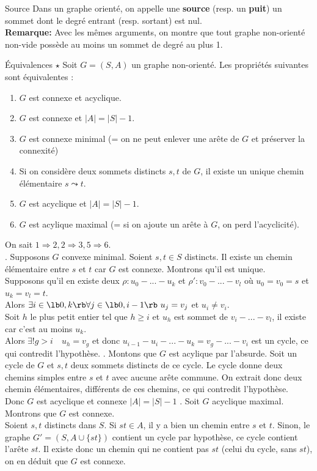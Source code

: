 \documentclass[french, 11pt]{article}
\begin{document}
\begin{defi}{Source}{}
    Dans un graphe orienté, on appelle une \textbf{source} (resp. un \textbf{puit}) un sommet dont le degré entrant (resp. sortant) est nul.\\
    \textbf{Remarque:} Avec les mêmes arguments, on montre que tout graphe non-orienté non-vide possède au moins un sommet de degré au plus 1.
\end{defi}

\begin{prop}{Équivalences $\star$}{}
    Soit $G=(S,A)$ un graphe non-orienté. Les propriétés suivantes sont équivalentes :
    \begin{enumerate}[topsep=0pt,itemsep=-0.9 ex]
        \item $G$ est connexe et acyclique.
        \item $G$ est connexe et $|A|=|S|-1$.
        \item $G$ est connexe minimal (= on ne peut enlever une arête de $G$ et préserver la connexité)
        \item Si on considère deux sommets distincts $s,t$ de $G$, il existe un unique chemin élémentaire $s\leadsto t$.
        \item $G$ est acyclique et $|A|=|S|-1$.
        \item $G$ est acylique maximal (= si on ajoute un arête à $G$, on perd l'acyclicité).
    \end{enumerate}
    \tcblower
    On sait $1\Rightarrow2,2\Rightarrow3,5\Rightarrow6$.\\
    . Supposons $G$ convexe minimal. Soient $s,t\in S$ distincts. Il existe un chemin élémentaire entre $s$ et $t$ car $G$ est connexe. Montrons qu'il est unique.\\
    Supposons qu'il en existe deux $\rho:u_0-...-u_k$ et $\rho':v_0-...-v_l$ où $u_0=v_0=s$ et $u_k=v_l=t$.\\
    Alors $\exists i \in \lb0,k\rb \forall j \in \lb 0, i-1 \rb ~ u_j = v_j$ et $u_i\neq v_i$.\\
    Soit $h$ le plus petit entier tel que $h\geq i$ et $u_h$ est sommet de $v_i-...-v_l$, il existe car c'est au moins $u_k$.\\
    Alors $\exists!g>i \quad u_h=v_g$  et donc $u_{i-1}-u_i-...-u_k=v_g-...-v_i$ est un cycle, ce qui contredit l'hypothèse.\n
    . Montons que $G$ est acylique par l'absurde. Soit un cycle de $G$ et $s,t$ deux sommets distincts de ce cycle.
    Le cycle donne deux chemins simples entre $s$ et $t$ avec aucune arête commune. On extrait donc deux chemin élémentaires, différents de ces chemins, ce qui contredit l'hypothèse.\\
    Donc $G$ est acyclique et connexe $|A|=|S|-1$\n
    . Soit $G$ acyclique maximal. Montrons que $G$ est connexe.\\
    Soient $s,t$ distincts dans $S$. Si $st\in A$, il y a bien un chemin entre $s$ et $t$. Sinon, le graphe $G'=(S,A\cup\{st\})$ contient un cycle par hypothèse, ce cycle contient l'arête $st$. Il existe donc un chemin qui ne contient pas $st$ (celui du cycle, sans $st$), on en déduit que $G$ est connexe.
\end{prop}
\end{document}
